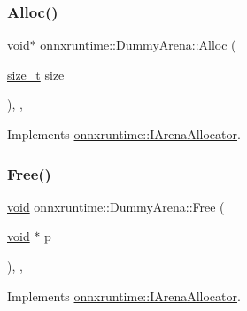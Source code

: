 \subsubsection{\texorpdfstring{Alloc()}{Alloc()}}
{\footnotesize\ttfamily \mbox{\hyperlink{mlasi_8h_a88f941d423cb2a819b70a1358982b1a6}{void}}$\ast$ onnxruntime\+::\+Dummy\+Arena\+::\+Alloc (\begin{DoxyParamCaption}\item[{\mbox{\hyperlink{mlasi_8h_a503efbc1c6e50825320ad909366b78ab}{size\+\_\+t}}}]{size }\end{DoxyParamCaption})\hspace{0.3cm}{\ttfamily [inline]}, {\ttfamily [override]}, {\ttfamily [virtual]}}



Implements \mbox{\hyperlink{classonnxruntime_1_1IArenaAllocator_a879507b0ec3b184d9bb60281191b8cd6}{onnxruntime\+::\+I\+Arena\+Allocator}}.

\mbox{\label{classonnxruntime_1_1DummyArena_a58196d32ed10a9d9aba3681457ec982d}} 
\subsubsection{\texorpdfstring{Free()}{Free()}}
{\footnotesize\ttfamily \mbox{\hyperlink{mlasi_8h_a88f941d423cb2a819b70a1358982b1a6}{void}} onnxruntime\+::\+Dummy\+Arena\+::\+Free (\begin{DoxyParamCaption}\item[{\mbox{\hyperlink{mlasi_8h_a88f941d423cb2a819b70a1358982b1a6}{void}} $\ast$}]{p }\end{DoxyParamCaption})\hspace{0.3cm}{\ttfamily [inline]}, {\ttfamily [override]}, {\ttfamily [virtual]}}



Implements \mbox{\hyperlink{classonnxruntime_1_1IArenaAllocator_a3341fde74c8461678359fb903fe78df3}{onnxruntime\+::\+I\+Arena\+Allocator}}.

\mbox{\label{classonnxruntime_1_1DummyArena_a7f85a06ef904b9fe007e76d18a8d68a9}} 
